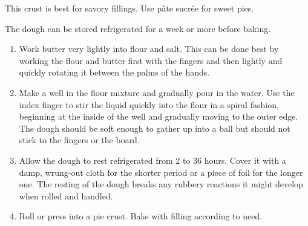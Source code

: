 
\begin{ingredients}
\end{ingredients}

\begin{recipe}

This crust is best for savory fillings.  Use p\^ate sucr\'ee for sweet pies.

The dough can be stored refrigerated for a week or more before baking.

  \begin{enumerate}
  \item Work butter very lightly into flour and salt.  This can be
  done best by working the flour and butter first with the fingers and
  then lightly and quickly rotating it between the palms of the
  hands.

\item Make a well in the flour mixture and gradually pour in the
  water.  Use the index finger to stir the liquid quickly into the
  flour in a spiral fashion, beginning at the inside of the well and
  gradually moving to the outer edge.  The dough should be soft enough
  to gather up into a ball but should not stick to the fingers or the
  board.

\item Allow the dough to rest refrigerated from 2 to 36 hours.  Cover
  it with a damp, wrung-out cloth for the shorter period or a piece of
  foil for the longer one.  The resting of the dough breaks any
  rubbery reactions it might develop when rolled and handled.

\item Roll or press into a pie crust.  Bake with filling according to need.

  \end{enumerate}
\end{recipe}
